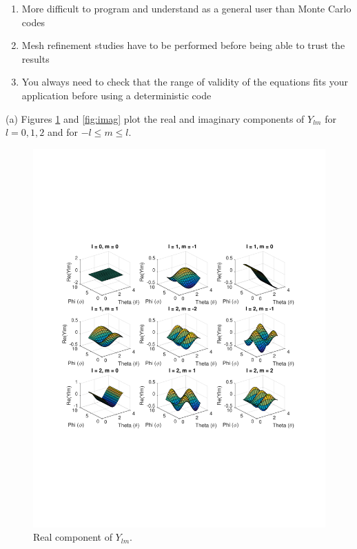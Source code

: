 \documentclass[10pt]{article}
\newcommand*\circled[1]{\tikz[baseline=(char.base)]{
            \node[shape=circle,draw,inner sep=2pt] (char) {#1};}}
\begin{document}
\begin{enumerate}
\item More difficult to program and understand as a general user than Monte Carlo codes
\item Mesh refinement studies have to be performed before being able to trust the results
\item You always need to check that the range of validity of the equations fits your application before using a deterministic code
\end{enumerate}

\clearpage
\circled{4} (a) Figures \ref{fig:real} and \ref{fig:imag} plot the real and imaginary components of \(Y_{lm}\) for \(l=0, 1, 2\) and for \(-l\leq m\leq l\).

\begin{figure}[H]
  \centering
  \includegraphics[width=15cm]{Real_Ylm.pdf}
  \caption{Real component of \(Y_{lm}\).}
  \label{fig:real}
\end{figure}
\end{document}
